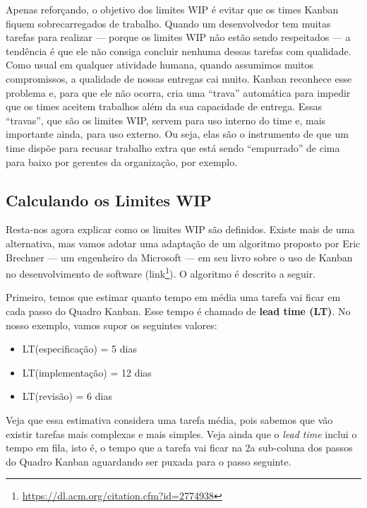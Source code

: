 \documentclass[
  11pt,
  twoside]{book}
\DeclareRobustCommand{\href}[2]{#2\footnote{\url{#1}}}
\begin{document}
Apenas reforçando, o objetivo dos limites WIP é evitar que os times
Kanban fiquem sobrecarregados de trabalho. Quando um desenvolvedor tem
muitas tarefas para realizar --- porque os limites WIP não estão sendo
respeitados --- a tendência é que ele não consiga concluir nenhuma
dessas tarefas com qualidade. Como usual em qualquer atividade humana,
quando assumimos muitos compromissos, a qualidade de nossas entregas cai
muito. Kanban reconhece esse problema e, para que ele não ocorra, cria
uma ``trava'' automática para impedir que os times aceitem trabalhos
além da sua capacidade de entrega. Essas ``travas'', que são os limites
WIP, servem para uso interno do time e, mais importante ainda, para uso
externo. Ou seja, elas são o instrumento de que um time dispõe para
recusar trabalho extra que está sendo ``empurrado'' de cima para baixo
por gerentes da organização, por exemplo.

\hypertarget{calculando-os-limites-wip}{%
\subsection{Calculando os Limites WIP}\label{calculando-os-limites-wip}}

  Resta-nos agora
explicar como os limites WIP são definidos. Existe mais de uma
alternativa, mas vamos adotar uma adaptação de um algoritmo proposto por
Eric Brechner --- um engenheiro da Microsoft --- em seu livro sobre o
uso de Kanban no desenvolvimento de software
(\href{https://dl.acm.org/citation.cfm?id=2774938}{link}). O algoritmo é
descrito a seguir.

Primeiro, temos que estimar quanto tempo em média uma tarefa vai ficar
em cada passo do Quadro Kanban. Esse tempo é chamado de \textbf{lead
time (LT)}. No nosso exemplo, vamos supor os seguintes valores:

\begin{itemize}
\item
  LT(especificação) = 5 dias
\item
  LT(implementação) = 12 dias
\item
  LT(revisão) = 6 dias
\end{itemize}

Veja que essa estimativa considera uma tarefa média, pois sabemos que
vão existir tarefas mais complexas e mais simples. Veja ainda que o
\emph{lead time} inclui o tempo em fila, isto é, o tempo que a tarefa
vai ficar na 2a sub-coluna dos passos do Quadro Kanban aguardando ser
puxada para o passo seguinte.
\end{document}
